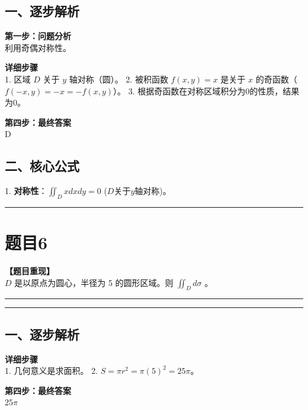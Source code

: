 \documentclass[12pt, a4paper]{ctexart}
\newcommand{\TopSeparator}{
    \par\noindent\rule{\textwidth}{1.5pt}\vspace{0.5em} %
}
\newcommand{\AnalysisSeparator}{
    \par\noindent\rule{\textwidth}{0.5pt}\vspace{0.2em}\hrule\vspace{0.5em} %
}
\newenvironment{RedAnalysis}{
    \par
    \color{red} %
}{
    \par
    \color{black} %
}
\begin{document}
\begin{RedAnalysis}

\subsection*{一、逐步解析}

\textbf{第一步：问题分析} \\
利用奇偶对称性。

\textbf{详细步骤} \\
1. 区域 $D$ 关于 $y$ 轴对称（圆）。
2. 被积函数 $f(x,y) = x$ 是关于 $x$ 的奇函数（$f(-x,y) = -x = -f(x,y)$）。
3. 根据奇函数在对称区域积分为0的性质，结果为0。

\textbf{第四步：最终答案} \\
D

\subsection*{二、核心公式}
1. \textbf{对称性}：$\iint_D x dxdy = 0$ ($D$关于$y$轴对称)。

\end{RedAnalysis}

\vspace{2em}

\TopSeparator
\section*{题目6}

\textbf{【题目重现】} \\
$D$ 是以原点为圆心，半径为 5 的圆形区域。则 $ \iint_{D} d\sigma $ \underline{\hspace{2cm}}。

\AnalysisSeparator

\begin{RedAnalysis}

\subsection*{一、逐步解析}

\textbf{详细步骤} \\
1. 几何意义是求面积。
2. $S = \pi r^2 = \pi (5)^2 = 25\pi$。

\textbf{第四步：最终答案} \\
$ 25\pi $

\end{RedAnalysis}

\vspace{2em}
\end{document}
